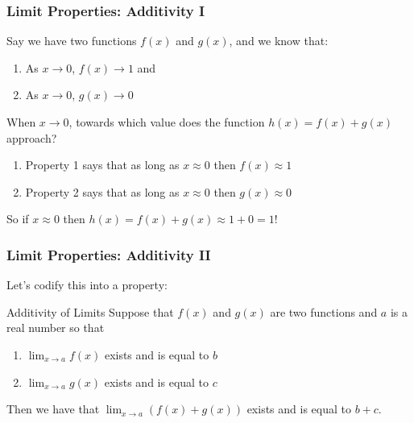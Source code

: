 \documentclass{ltx-talk}
\begin{document}
\begin{frame}
  \frametitle{Limit Properties: Additivity I}

  Say we have two functions $f(x)$ and $g(x)$, and we know that:
  \begin{enumerate}
    \item As $x \rightarrow 0$, $f(x) \rightarrow 1$ and \pause
    \item As $x \rightarrow 0$, $g(x) \rightarrow 0$ \pause
  \end{enumerate}

  When $x \rightarrow 0$, towards which value does the function $h(x) = f(x) + g(x)$ approach?

  \begin{enumerate}
    \item Property 1 says that as long as $x \approx 0$ then $f(x) \approx 1$ \pause
    \item Property 2 says that as long as $x \approx 0$ then $g(x) \approx 0$ \pause
  \end{enumerate}

  So if $x \approx 0$ then $h(x) = f(x) + g(x) \approx 1 + 0 = 1$!
\end{frame}

\begin{frame}
  \frametitle{Limit Properties: Additivity II}

  Let's codify this into a property: \pause

  \begin{alertblock}{Additivity of Limits}
    Suppose that $f(x)$ and $g(x)$ are two functions and $a$ is a real number so that \pause
    \begin{enumerate}
      \item $\lim_{x \rightarrow a} f(x)$ exists \pause and is equal to $b$ \pause
      \item $\lim_{x \rightarrow a} g(x)$ exists \pause and is equal to $c$ \pause
    \end{enumerate}

    Then we have that $\lim_{x \rightarrow a} (f(x) + g(x))$ exists \pause and is equal to $b + c$.
  \end{alertblock}
\end{frame}
\end{document}
